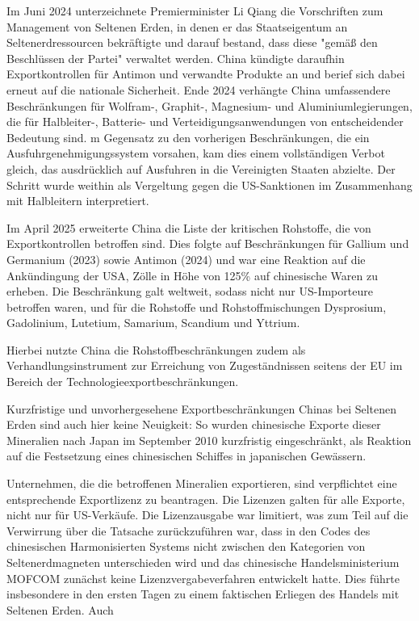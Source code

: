 \documentclass[12pt,a4paper,oneside]{book} %
\begin{document}
Im Juni 2024 unterzeichnete Premierminister Li Qiang die Vorschriften zum Management von Seltenen Erden, in denen er das Staatseigentum an Seltenerdressourcen bekräftigte und darauf bestand, dass diese "gemäß den Beschlüssen der Partei" verwaltet werden. China kündigte daraufhin Exportkontrollen für Antimon und verwandte Produkte an und berief sich dabei erneut auf die nationale Sicherheit. Ende 2024 verhängte China umfassendere Beschränkungen für Wolfram-, Graphit-, Magnesium- und Aluminiumlegierungen, die für Halbleiter-, Batterie- und Verteidigungsanwendungen von entscheidender Bedeutung sind. m Gegensatz zu den vorherigen Beschränkungen, die ein Ausfuhrgenehmigungssystem vorsahen, kam dies einem vollständigen Verbot gleich, das ausdrücklich auf Ausfuhren in die Vereinigten Staaten abzielte. Der Schritt wurde weithin als Vergeltung gegen die US-Sanktionen im Zusammenhang mit Halbleitern interpretiert.

Im April 2025 erweiterte China die Liste der kritischen Rohstoffe, die von Exportkontrollen betroffen sind.\autocite{https://www.reuters.com/world/china/chinas-export-controls-are-curbing-critical-mineral-shipments-world-2025-04-20/} Dies folgte auf Beschränkungen für Gallium und Germanium (2023) sowie Antimon (2024) und war eine Reaktion auf die Ankündingung der USA, Zölle in Höhe von 125\% auf chinesische Waren zu erheben. Die Beschränkung galt weltweit, sodass nicht nur US-Importeure betroffen waren, und für die Rohstoffe und Rohstoffmischungen Dysprosium, Gadolinium, Lutetium, Samarium, Scandium und Yttrium.

Hierbei nutzte China die Rohstoffbeschränkungen zudem als Verhandlungsinstrument zur Erreichung von Zugeständnissen seitens der EU im Bereich der Technologieexportbeschränkungen.\autocite{Rohstoffe als Verhandlungswaffe}

Kurzfristige und unvorhergesehene Exportbeschränkungen Chinas bei Seltenen Erden sind auch hier keine Neuigkeit: So wurden chinesische Exporte dieser Mineralien nach Japan im September 2010 kurzfristig eingeschränkt, als Reaktion auf die Festsetzung eines chinesischen Schiffes in japanischen Gewässern.


Unternehmen, die die betroffenen Mineralien exportieren, sind verpflichtet eine entsprechende Exportlizenz zu beantragen.\autocite[Dessen Beantragung veranschlagt sechs Wochen;]{Wolf. Edda: China führt Exportauflagen für kritische Metalle ein, GTAI} Die Lizenzen galten für alle Exporte, nicht nur für US-Verkäufe. Die Lizenzausgabe war limitiert, was zum Teil auf die Verwirrung über die Tatsache zurückzuführen war, dass in den Codes des chinesischen Harmonisierten Systems nicht zwischen den Kategorien von Seltenerdmagneten unterschieden wird und das chinesische Handelsministerium MOFCOM zunächst keine Lizenzvergabeverfahren entwickelt hatte. Dies führte insbesondere in den ersten Tagen zu einem faktischen Erliegen des Handels mit Seltenen Erden. Auch 
\end{document}
